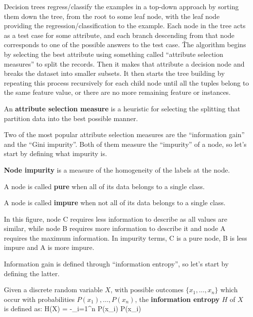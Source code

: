 
Decision trees regress/classify the examples in a top-down approach by sorting them down the tree, from the root to
some leaf node, with the leaf node providing the regression/classification to the example. Each node in the tree
acts as a test case for some attribute, and each branch descending from that node corresponds to one of the possible
answers to the test case. \v

The algorithm begins by selecting the best attribute using something called ``attribute selection measures'' to
split the records. Then it makes that attribute a decision node and breaks the dataset into smaller subsets. It then
starts the tree building by repeating this process recursively for each child node until all the tuples belong to
the same feature value, or there are no more remaining feature or instances.

An \textbf{attribute selection measure} is a heuristic for selecting the splitting that partition data into the best
possible manner.
\ed

Two of the most popular attribute selection measures are the ``information gain'' and the ``Gini impurity''. Both of
them measure the ``impurity'' of a node, so let's start by defining what impurity is.

\textbf{Node impurity} is a measure of the homogeneity of the labels at the node.
\ed

A node is called \textbf{pure} when all of its data belongs to a single class.
\ed

A node is called \textbf{impure} when not all of its data belongs to a single class.
\ed

\be
In this figure, node C requires less information to describe as all values are similar, while node B requires more
information to describe it and node A requires the maximum information. In impurity terms, C is a pure node, B is less
impure and A is more impure.

\ee

Information gain is defined through ``information entropy'', so let's start by defining the latter.

Given a discrete random variable $X$, with possible outcomes $\{x_{1}, \ldots, x_{n} \}$ which occur with probabilities
$P(x_{1}), \ldots, P (x_{n})$, the \textbf{information entropy} $H$ of $X$ is defined as:
\bse
H(X) = -\sum _{i=1}^{n} {P(x_{i}) \log P(x_{i})}
\ese

